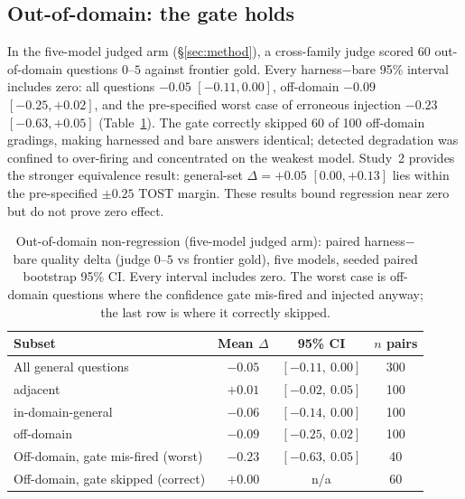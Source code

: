 \documentclass[10pt,twocolumn]{article}
\begin{document}
\subsection{Out-of-domain: the gate holds}\label{sec:ood}
In the five-model judged arm (\S\ref{sec:method}), a cross-family judge scored 60 out-of-domain questions $0$--$5$ against frontier gold. Every harness$-$bare 95\% interval includes zero: all questions $-0.05$ $[-0.11,0.00]$, off-domain $-0.09$ $[-0.25,+0.02]$, and the pre-specified worst case of erroneous injection $-0.23$ $[-0.63,+0.05]$ (Table~\ref{tab:ood}). The gate correctly skipped 60 of 100 off-domain gradings, making harnessed and bare answers identical; detected degradation was confined to over-firing and concentrated on the weakest model. Study~2 provides the stronger equivalence result: general-set $\Delta=+0.05$ $[0.00,+0.13]$ lies within the pre-specified $\pm0.25$ TOST margin. These results bound regression near zero but do not prove zero effect.

\begin{table}[t]\centering\small
\caption{Out-of-domain non-regression (five-model judged arm): paired harness$-$bare quality delta (judge
$0$--$5$ vs frontier gold), five models, seeded paired bootstrap 95\% CI. Every interval includes
zero. The worst case is off-domain questions where the confidence gate mis-fired and injected anyway;
the last row is where it correctly skipped.}
\label{tab:ood}
\begin{tabular}{lccc}
\toprule
Subset & Mean $\Delta$ & 95\% CI & $n$ pairs \\
\midrule
All general questions              & $-0.05$ & $[-0.11,\ 0.00]$ & 300 \\
\quad adjacent                     & $+0.01$ & $[-0.02,\ 0.05]$ & 100 \\
\quad in-domain-general            & $-0.06$ & $[-0.14,\ 0.00]$ & 100 \\
\quad off-domain                   & $-0.09$ & $[-0.25,\ 0.02]$ & 100 \\
Off-domain, gate mis-fired (worst) & $-0.23$ & $[-0.63,\ 0.05]$ & 40 \\
Off-domain, gate skipped (correct) & $+0.00$ & n/a              & 60 \\
\bottomrule
\end{tabular}
\end{table}
\end{document}

